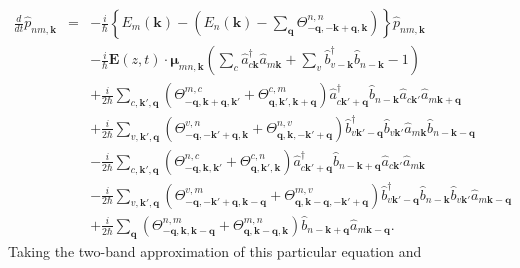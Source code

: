 \begin{eqnarray}
\frac{d}{dt}\hat{p}_{nm,\mathbf{k}} & = & -\frac{i}{\hbar}\left\{ E_{m}(\mathbf{k})-\left(E_{n}(\mathbf{k})-\sum_{\mathbf{q}}\Theta_{-\mathbf{q},-\mathbf{k}+\mathbf{q},\mathbf{k}}^{n,n}\right)\right\} \hat{p}_{nm,\mathbf{k}}\label{eq:Coulomb_Inter_Polarization_Eq_1}\\
 &  & -\frac{i}{\hbar}\mathbf{E}(z,t)\cdot\boldsymbol{\mu}_{mn,\mathbf{k}}\left(\sum_{c}\hat{a}_{c\mathbf{k}}^{\dagger}\hat{a}_{m\mathbf{k}}+\sum_{v}\hat{b}_{v-\mathbf{k}}^{\dagger}\hat{b}_{n-\mathbf{k}}-1\right)\label{eq:Coulomb_Inter_Polarization_Eq_2}\\
 &  & +\frac{i}{2\hbar}\sum_{c,\mathbf{k}',\mathbf{q}}\left(\Theta_{-\mathbf{q},\mathbf{k}+\mathbf{q},\mathbf{k}'}^{m,c}+\Theta_{\mathbf{q},\mathbf{k}',\mathbf{k}+\mathbf{q}}^{c,m}\right)\hat{a}_{c\mathbf{k}'+\mathbf{q}}^{\dagger}\hat{b}_{n-\mathbf{k}}\hat{a}_{c\mathbf{k}'}\hat{a}_{m\mathbf{k}+\mathbf{q}}\label{eq:Coulomb_Inter_Polarization_Eq_3}\\
 &  & +\frac{i}{2\hbar}\sum_{v,\mathbf{k}',\mathbf{q}}\left(\Theta_{-\mathbf{q},-\mathbf{k}'+\mathbf{q},\mathbf{k}}^{v,n}+\Theta_{\mathbf{q},\mathbf{k},-\mathbf{k}'+\mathbf{q}}^{n,v}\right)\hat{b}_{v\mathbf{k}'-\mathbf{q}}^{\dagger}\hat{b}_{v\mathbf{k}'}\hat{a}_{m\mathbf{k}}\hat{b}_{n-\mathbf{k}-\mathbf{q}}\label{eq:Coulomb_Inter_Polarization_Eq_4}\\
 &  & -\frac{i}{2\hbar}\sum_{c,\mathbf{k}',\mathbf{q}}\left(\Theta_{-\mathbf{q},\mathbf{k},\mathbf{k}'}^{n,c}+\Theta_{\mathbf{q},\mathbf{k}',\mathbf{k}}^{c,n}\right)\hat{a}_{c\mathbf{k}'+\mathbf{q}}^{\dagger}\hat{b}_{n-\mathbf{k}+\mathbf{q}}\hat{a}_{c\mathbf{k}'}\hat{a}_{m\mathbf{k}}\label{eq:Coulomb_Inter_Polarization_Eq_5}\\
 &  & -\frac{i}{2\hbar}\sum_{v,\mathbf{k}',\mathbf{q}}\left(\Theta_{-\mathbf{q},-\mathbf{k}'+\mathbf{q},\mathbf{k}-\mathbf{q}}^{v,m}+\Theta_{\mathbf{q},\mathbf{k}-\mathbf{q},-\mathbf{k}'+\mathbf{q}}^{m,v}\right)\hat{b}_{v\mathbf{k}'-\mathbf{q}}^{\dagger}\hat{b}_{n-\mathbf{k}}\hat{b}_{v\mathbf{k}'}\hat{a}_{m\mathbf{k}-\mathbf{q}}\label{eq:Coulomb_Inter_Polarization_Eq_6}\\
 &  & +\frac{i}{2\hbar}\sum_{\mathbf{q}}\left(\Theta_{-\mathbf{q},\mathbf{k},\mathbf{k}-\mathbf{q}}^{n,m}+\Theta_{\mathbf{q},\mathbf{k}-\mathbf{q},\mathbf{k}}^{m,n}\right)\hat{b}_{n-\mathbf{k}+\mathbf{q}}\hat{a}_{m\mathbf{k}-\mathbf{q}}.\label{eq:Coulomb_Inter_Polarization_Eq_7}\end{eqnarray}
Taking the two-band approximation of this particular equation and
